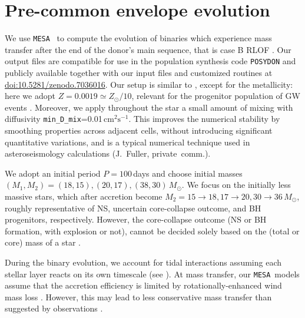 \documentclass[twocolumn,twocolappendix,trackchanges]{aastex63}
\newcommand{\code}[1]{\texttt{#1}}
\newcommand{\mesa}{\code{MESA}}
\begin{document}
\section{Pre-common envelope evolution}
\label{sec:methods}

We use \mesa\ \citep[version 15140,][]{paxton:2011, paxton:2013,
  paxton:2015, paxton:2018, paxton:2019, jermyn:2022} to compute the evolution of
binaries which experience mass transfer after the end of the donor's
main sequence, that is case B RLOF
\citep[][]{kippenhahn:1967}. Our output files are compatible for
use in the population synthesis code \code{POSYDON}
\citep{fragos:2022} and publicly available together with our input
files and customized routines at
\href{https://zenodo.org/record/7036016}{doi:10.5281/zenodo.7036016}.
Our setup is similar to \cite{renzo:2021zoph}, except for the
metallicity: here we adopt $Z=0.0019\simeq Z_\odot/10$, relevant for
the progenitor population of GW events \citep[e.g.,][]{vanson:2021}.
Moreover, we apply throughout the star a small amount of mixing with
diffusivity \texttt{min\_D\_mix}=0.01\,$\mathrm{cm^2 s^{-1}}$. This
improves the numerical stability by smoothing properties across
adjacent cells, without introducing significant quantitative
variations, and is a typical numerical technique used in
asteroseismology calculations (J.~Fuller, private~comm.).

We adopt an initial period $P=100$\,days and choose initial masses
$(M_{1}, M_{2}) = (18, 15), (20, 17), (38, 30)\,M_\odot$. We focus on
the initially less massive stars, which after accretion become
$M_2=15\rightarrow 18, 17\rightarrow 20, 30\rightarrow 36\,M_\odot$,
roughly representative of NS, uncertain core-collapse outcome, and BH
progenitors, respectively. However, the core-collapse outcome (NS or
BH formation, with explosion or not), cannot be decided solely based
on the (total or core) mass of a star \citep[e.g.,][]{oconnor:11,
  farmer:16, patton:2020, zapartas:21b, patton:22}.

During the binary evolution, we account for tidal
  interactions assuming each stellar layer reacts on its own timescale
  (see \citealt{paxton:2015}). At mass transfer, our \mesa\ models
assume that the accretion efficiency is limited by
rotationally-enhanced wind mass loss \citep[e.g.,][]{sravan:2019,
  wang:2020, renzo:2021zoph, sen:2022}. However, this may lead to less
conservative mass transfer than suggested by observations
\citep[e.g.,][]{wang:2021a}.
\end{document}
